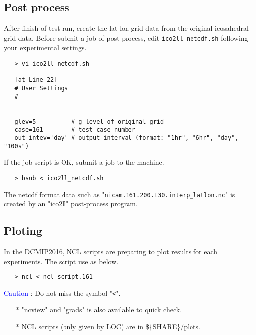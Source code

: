 \documentclass[a4paper]{article}
\begin{document}
\subsection{Post process}
 After finish of test run, create the lat-lon grid data from
 the original icosahedral grid data.
 Before submit a job of post process, edit \verb|ico2ll_netcdf.sh|
 following your experimental settings.
 \begin{verbatim}
   > vi ico2ll_netcdf.sh

   [at Line 22]
   # User Settings
   # ---------------------------------------------------------------------

   glev=5          # g-level of original grid
   case=161        # test case number
   out_intev='day' # output interval (format: "1hr", "6hr", "day", "100s")
 \end{verbatim}

 \noindent If the job script is OK, submit a job to the machine.
 \begin{verbatim}
   > bsub < ico2ll_netcdf.sh
 \end{verbatim}

 \noindent The netcdf format data such as "\verb|nicam.161.200.L30.interp_latlon.nc|"
 is created by an "ico2ll" post-process program.


\subsection{Ploting}
 In the DCMIP2016, NCL scripts are preparing to plot results
 for each experiments. The script use as below.
 \begin{verbatim}
   > ncl < ncl_script.161
 \end{verbatim}
 \noindent \textcolor{blue}{{\sf Caution}} : Do not miss the symbol "\verb|<|". \\

 \begin{itemize}
   \item[*] "ncview" and "grads" is also available to quick check.
   \item[*] NCL scripts (only given by LOC) are in \$\{SHARE\}/plots.
 \end{itemize}



\clearpage
\end{document}
